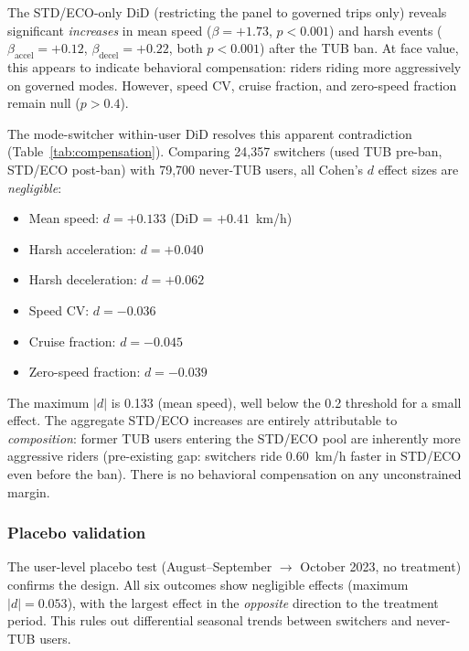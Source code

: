 The STD/ECO-only DiD (restricting the panel to governed trips only) reveals significant \textit{increases} in mean speed ($\beta = +1.73$, $p < 0.001$) and harsh events ($\beta_{\text{accel}} = +0.12$, $\beta_{\text{decel}} = +0.22$, both $p < 0.001$) after the TUB ban. At face value, this appears to indicate behavioral compensation: riders riding more aggressively on governed modes. However, speed CV, cruise fraction, and zero-speed fraction remain null ($p > 0.4$).

The mode-switcher within-user DiD resolves this apparent contradiction (Table~\ref{tab:compensation}). Comparing 24,357 switchers (used TUB pre-ban, STD/ECO post-ban) with 79,700 never-TUB users, all Cohen's $d$ effect sizes are \textit{negligible}:

\begin{itemize}
    \item Mean speed: $d = +0.133$ (DiD = $+0.41$~km/h)
    \item Harsh acceleration: $d = +0.040$
    \item Harsh deceleration: $d = +0.062$
    \item Speed CV: $d = -0.036$
    \item Cruise fraction: $d = -0.045$
    \item Zero-speed fraction: $d = -0.039$
\end{itemize}

The maximum $|d|$ is 0.133 (mean speed), well below the 0.2 threshold for a small effect. The aggregate STD/ECO increases are entirely attributable to \textit{composition}: former TUB users entering the STD/ECO pool are inherently more aggressive riders (pre-existing gap: switchers ride 0.60~km/h faster in STD/ECO even before the ban). There is no behavioral compensation on any unconstrained margin.

\subsubsection{Placebo validation}

The user-level placebo test (August--September $\rightarrow$ October 2023, no treatment) confirms the design. All six outcomes show negligible effects (maximum $|d| = 0.053$), with the largest effect in the \textit{opposite} direction to the treatment period. This rules out differential seasonal trends between switchers and never-TUB users.

